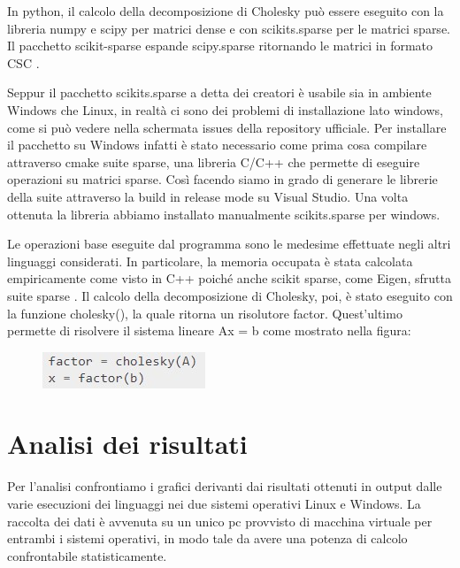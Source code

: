 \documentclass[a4paper,10pt]{article}
\begin{document}
In python, il calcolo della decomposizione di Cholesky può essere eseguito con la libreria numpy e scipy per matrici dense e con scikits.sparse per le matrici sparse. Il pacchetto scikit-sparse espande scipy.sparse ritornando le matrici in formato CSC . 

Seppur il pacchetto scikits.sparse a detta dei creatori è usabile sia in ambiente Windows che Linux, in realtà ci sono dei problemi di installazione lato windows, come si può vedere nella schermata issues della repository ufficiale. Per installare il pacchetto su Windows infatti è stato necessario come prima cosa compilare attraverso cmake suite sparse, una libreria C/C++ che permette di eseguire operazioni su matrici sparse. Così facendo siamo in grado di generare le librerie della suite attraverso la build in release mode su Visual Studio. Una volta ottenuta la libreria abbiamo installato manualmente scikits.sparse per windows. 

Le operazioni base eseguite dal programma sono le medesime effettuate negli altri linguaggi considerati. In particolare, la memoria occupata è stata calcolata empiricamente come visto in C++ poiché anche scikit sparse, come Eigen, sfrutta suite sparse %
. Il calcolo della decomposizione di Cholesky, poi, è stato eseguito con la funzione cholesky(), la quale ritorna un risolutore factor. Quest’ultimo permette di risolvere il sistema lineare Ax = b come mostrato nella figura:

\begin{figure}[H]
\centering
\includegraphics[width=0.4\linewidth]{img/python1.jpg}
\end{figure}

\newpage

\section{Analisi dei risultati}
Per l’analisi confrontiamo i grafici derivanti dai risultati ottenuti in output dalle varie esecuzioni dei linguaggi nei due sistemi operativi Linux e Windows. 
La raccolta dei dati è avvenuta su un unico pc provvisto di macchina virtuale per entrambi i sistemi operativi, in modo tale da avere una potenza di calcolo confrontabile statisticamente.
\end{document}
